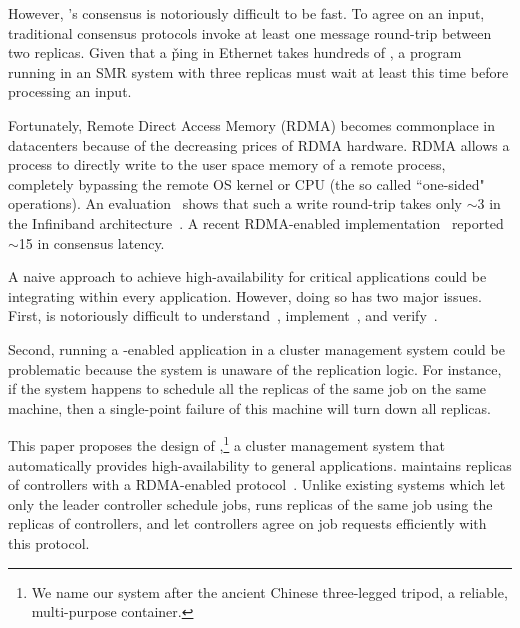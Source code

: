 

However, \paxos's consensus is notoriously difficult to be fast. 
To agree on an input, traditional consensus protocols invoke at least one 
message round-trip between two replicas. Given that a \v{ping} in Ethernet 
takes hundreds of \us, a program running in an SMR system with three replicas 
must wait at least this time before processing an input. 

Fortunately, Remote Direct Access Memory (RDMA) becomes commonplace in 
datacenters because of the decreasing prices of RDMA hardware. RDMA allows a 
process to directly write to the user space memory of a remote process, 
completely bypassing the remote OS kernel or CPU (the so called ``one-sided" 
operations). An evaluation~\cite{pilaf:usenix14} shows that such a write 
round-trip takes only $\sim$3 \us in the Infiniband 
architecture~\cite{infiniband}. A recent 
RDMA-enabled \paxos implementation~\cite{dare:hpdc15} reported 
$\sim$15 \us in consensus latency.

A naive approach to achieve high-availability for critical applications could 
be integrating \paxos within every application. However, doing so has two major
issues. First, \paxos is notoriously difficult 
to understand~\cite{raft:usenix14}, implement~\cite{paxos:practical}, and 
verify~\cite{demeter:sosp11}.

Second, running a \paxos-enabled application in a 
cluster management system could be problematic because the system is unaware 
of the replication logic. For instance, if the system happens to schedule all 
the replicas of the same job on the same machine, then a single-point failure 
of this machine will turn down all replicas. 


This paper proposes the design of \xxx,\footnote{We name our system after the 
ancient Chinese three-legged tripod, a reliable, multi-purpose container.} a 
cluster management system that automatically provides high-availability to 
general applications. \xxx maintains replicas of controllers with a RDMA-enabled 
\paxos protocol~\cite{falcon:github}. Unlike existing systems which let only the 
leader controller schedule jobs, \xxx runs replicas of the same job using the 
replicas of controllers, and \xxx let controllers agree on job requests 
efficiently with this protocol. 

